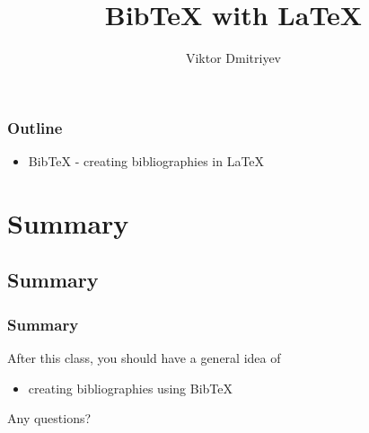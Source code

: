 \documentclass[slidestop,compress,mathserif]{beamer}
\title{BibTeX with LaTeX}
\subtitle{}
\author{Viktor Dmitriyev}
\institute{Adapted from Mini Course on LaTeX by \href{https://github.com/OpenIntroOrg/mini-course-materials}{David Diez}}
\date{}
\begin{document}
\newenvironment{act}[1]{{\color{command}#1}}{}
\newcommand{\lcom}[1]{{\color{command}$\backslash$#1}}
\newcommand{\larg}[1]{{\color{braces}$\{${\color{black}#1}$\}$}}
\newcommand{\mathText}[1]{{\color{braces}\${\color{black}#1}\$}}


\frame{ \titlepage }

\begin{frame}
  \frametitle{Outline}
  \begin{itemize}
  \item BibTeX - creating bibliographies in LaTeX
  \end{itemize}
\end{frame}



\section[Summary]{Summary}
\subsection[Summary]{Summary}

\begin{frame}  \frametitle{Summary}
After this class, you should have a general idea of
\vspace{1mm} \\
\begin{itemize}
	\item creating bibliographies using BibTeX
\end{itemize}
\vspace{1mm}
Any questions?
\end{frame}
\end{document}
